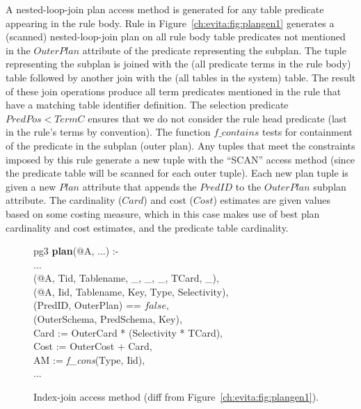 A nested-loop-join plan access method is generated for any table predicate appearing
in the rule body. Rule  in Figure~\ref{ch:evita:fig:plangen1} generates a
(scanned) nested-loop-join 
plan on all rule body table predicates not mentioned in the $OuterPlan$ attribute of the 
predicate representing the subplan. The  tuple representing the subplan is joined with 
the  (all predicate terms in the rule body) table followed by another join with 
the  (all tables in the system) table. The result of these join operations produce all 
term predicates mentioned in the rule that have a matching table identifier definition. 
The selection predicate $PredPos < TermC$ ensures that we do not
consider the rule head predicate (last in the rule's terms by
convention). The function $f\_contains$ tests for containment of the predicate in the subplan (outer plan). 
Any tuples that meet the constraints imposed by this rule generate a new  
tuple with the ``SCAN'' access method (since the predicate table will be scanned for each outer tuple). 
Each new plan tuple is given a new $Plan$ attribute that appends the $PredID$ to the $OuterPlan$ 
subplan attribute. 
The cardinality ($Card$) and cost ($Cost$) estimates are given values based on some costing 
measure, which in this case makes use of best plan cardinality and cost estimates, and the predicate 
table cardinality.

\begin{figure}
\ssp
\centering
\begin{boxedminipage}{\linewidth}
pg3 {\bf plan}(@A, ...) :-\\
\datalogspace ...\\
(@A, Tid, Tablename, \_, \_, \_, TCard, \_),\\
(@A, Iid, Tablename, Key, Type, Selectivity),\\
(PredID, OuterPlan) == $false$,\\
(OuterSchema, PredSchema, Key),\\
\datalogspace Card   := OuterCard * (Selectivity * TCard),\\
\datalogspace Cost   := OuterCost + Card,\\
\datalogspace AM := {\em f\_cons}(Type, Iid),\\
\datalogspace ...
\end{boxedminipage}
\caption{\label{ch:evita:fig:plangen2}Index-join access method (diff from Figure~\ref{ch:evita:fig:plangen1}).}
\end{figure}

